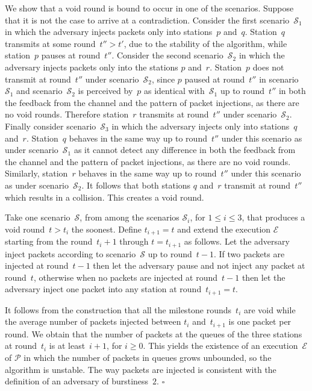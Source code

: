 \documentclass[11pt]{article}
\newcommand{\cE}{\mathcal{E}}
\newcommand{\cP}{\mathcal{P}}
\newcommand{\cS}{\mathcal{S}}
\newcommand{\qed}{\hfill $\square$ \smallbreak}
\newenvironment{proof}{\noindent{\bf Proof:}}{\qed}
\begin{document}
\begin{proof}
We show that a void round is bound to occur in one of the scenarios.
Suppose that it is not the case to arrive at a contradiction.
Consider the first scenario~$\cS_1$ in which the adversary injects packets only into stations~$p$ and~$q$.
Station~$q$ transmits at some round~$t''>t'$, due to the stability of the algorithm, while station~$p$ pauses at round~$t''$.
Consider the second scenario~$\cS_2$ in which the adversary injects packets only into the stations $p$ and~$r$.
Station~$p$ does not transmit at round~$t''$ under scenario~$\cS_2$, since $p$ paused at round~$t''$ in scenario~$\cS_1$ and scenario~$\cS_2$ is perceived by~$p$ as identical with~$\cS_1$ up to round~$t''$ in both the feedback from the channel and the pattern of packet injections, as there are no void rounds.
Therefore station~$r$ transmits at round~$t''$ under scenario~$\cS_2$.
Finally consider scenario~$\cS_3$ in which the adversary injects only into stations~$q$ and~$r$.
Station~$q$ behaves in the same way up to round~$t''$ under this scenario as under scenario~$\cS_1$ as it cannot detect any difference in both the feedback from the channel and the pattern of packet injections, as there are no void rounds.
Similarly, station~$r$ behaves in the same way up to round~$t''$ under this scenario as under scenario~$\cS_2$.
It follows that both stations $q$ and~$r$ transmit at round~$t''$ which results in a collision.
This creates a void round.

Take one scenario~$\cS$, from among the scenarios $\cS_i$, for $1\le i\le 3$, that produces a void round~$t>t_i$ the soonest.
Define $t_{i+1}=t$ and extend the execution $\cE$ starting from the round~$t_i+1$ through $t=t_{i+1}$ as follows.
Let the adversary inject packets according to scenario~$\cS$ up to round~$t - 1$.
If two packets are injected at round~$t-1$ then let the adversary pause and not inject any packet at round~$t$, otherwise when no packets are injected at round~$t-1$ then let the adversary inject one packet into any station at round~$t_{i+1}=t$.

It follows from the construction that all the milestone rounds~$t_i$ are void while the average number of packets injected between $t_i$ and~$t_{i+1}$ is one packet per round.
We obtain that the number of packets at the queues of the three stations at round~$t_{i}$ is at least~$i+1$, for $i \ge 0$.
This yields the existence of an execution~$\cE$ of $\cP$ in which the number of packets in queues grows unbounded, so the algorithm is unstable.
The way packets are injected is consistent with the definition of an adversary of burstiness~$2$.
\end{proof}
\end{document}
